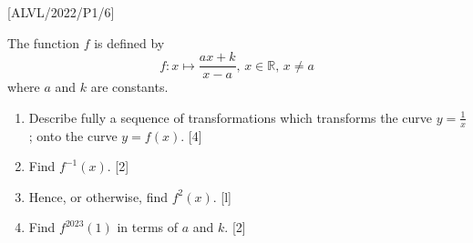 \item {[}ALVL/2022/P1/6{]}

The function $f$ is defined by 
\[
f:x\mapsto\frac{ax+k}{x-a},\,x\in\mathbb{R},\,x\neq a
\]
 where $a$ and $k$ are constants. 
\begin{enumerate}
\item Describe fully a sequence of transformations which transforms the
curve $y=\frac{1}{x}$; onto the curve $y=f\left(x\right)$. \hfill{}{[}4{]}
\item Find $f^{-1}(x)$.\hfill{} {[}2{]}
\item Hence, or otherwise, find $f^{2}(x)$.\hfill{} {[}l{]}
\item Find $f^{2023}\left(1\right)$ in terms of $a$ and $k$.\hfill{}
{[}2{]}
\end{enumerate}
